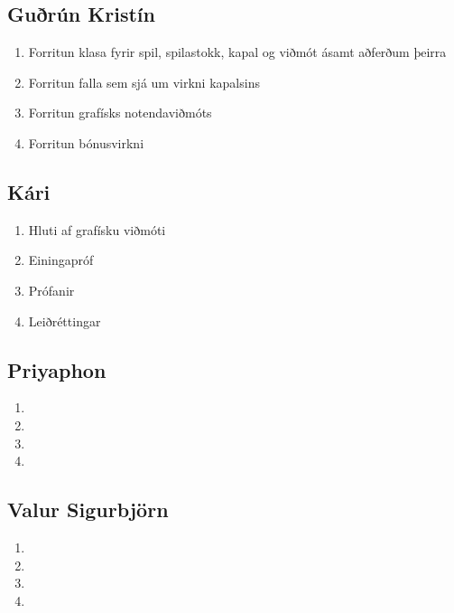 \documentclass[11pt,a4paper,titlepage]{article}
\theoremstyle{plain}
\theoremstyle{remark}
\begin{document}
\subsection*{Guðrún Kristín}

\begin{enumerate}
\item Forritun klasa fyrir spil, spilastokk, kapal og viðmót ásamt aðferðum þeirra
\item Forritun falla sem sjá um virkni kapalsins
\item Forritun grafísks notendaviðmóts
\item Forritun bónusvirkni
\end{enumerate}

\subsection*{Kári}

\begin{enumerate}
\item Hluti af grafísku viðmóti
\item Einingapróf
\item Prófanir
\item Leiðréttingar
\end{enumerate}

\subsection*{Priyaphon}

\begin{enumerate}
\item
\item
\item
\item
\end{enumerate}

\subsection*{Valur Sigurbjörn}

\begin{enumerate}
\item
\item
\item
\item
\end{enumerate}

	
\end{document}

